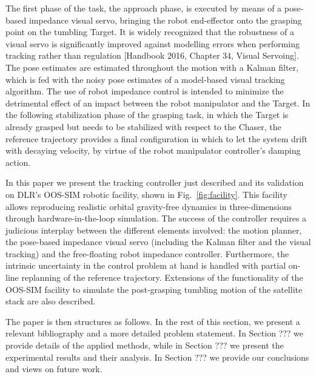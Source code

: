 The first phase of the task, the approach phase, is executed by means of a pose-based impedance visual servo, bringing the robot end-effector onto the grasping point on the tumbling Target. It is widely recognized that the robustness of a visual servo is significantly improved against modelling errors when performing tracking rather than regulation [Handbook 2016, Chapter 34, Visual Servoing]. The pose estimates are estimated throughout the motion with a Kalman filter, which is fed with the noisy pose estimates of a model-based visual tracking algorithm. The use of robot impedance control is intended to minimize the detrimental effect of an impact between the robot manipulator and the Target. In the following stabilization phase of the grasping task, in which the Target is already grasped but needs to be stabilized with respect to the Chaser, the reference trajectory provides a final configuration in which to let the system drift with decaying velocity, by virtue of the robot manipulator controller's damping action.

In this paper we present the tracking controller just described and its validation on DLR's OOS-SIM robotic facility, shown in Fig.~\ref{fig:facility}. This facility allows reproducing realistic orbital gravity-free dynamics in three-dimensions through hardware-in-the-loop simulation. The success of the controller requires a judicious interplay between the different elements involved: the motion planner, the pose-based impedance visual servo (including the Kalman filter and the visual tracking) and the free-floating robot impedance controller. Furthermore, the intrinsic uncertainty in the control problem at hand is handled with partial on-line replanning of the reference trajectory. Extensions of the functionality of the OOS-SIM facility to simulate the post-grasping tumbling motion of the satellite stack are also described.

The paper is then structures as follows. In the rest of this section, we present a relevant bibliography and a more detailed problem statement. In Section ??? we provide details of the applied methods, while in Section ??? we present the experimental results and their analysis. In Section ??? we provide our conclusions and views on future work.
%
